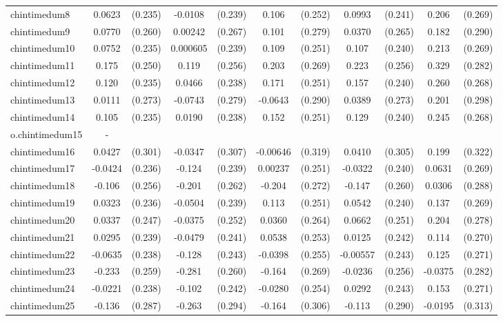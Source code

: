 \documentclass[]{article}
\begin{document}
\begin{tabular}{lcccccccccc}
chintimedum8 & 0.0623 & (0.235) & -0.0108 & (0.239) & 0.106 & (0.252) & 0.0993 & (0.241) & 0.206 & (0.269) \\
chintimedum9 & 0.0770 & (0.260) & 0.00242 & (0.267) & 0.101 & (0.279) & 0.0370 & (0.265) & 0.182 & (0.290) \\
chintimedum10 & 0.0752 & (0.235) & 0.000605 & (0.239) & 0.109 & (0.251) & 0.107 & (0.240) & 0.213 & (0.269) \\
chintimedum11 & 0.175 & (0.250) & 0.119 & (0.256) & 0.203 & (0.269) & 0.223 & (0.256) & 0.329 & (0.282) \\
chintimedum12 & 0.120 & (0.235) & 0.0466 & (0.238) & 0.171 & (0.251) & 0.157 & (0.240) & 0.260 & (0.268) \\
chintimedum13 & 0.0111 & (0.273) & -0.0743 & (0.279) & -0.0643 & (0.290) & 0.0389 & (0.273) & 0.201 & (0.298) \\
chintimedum14 & 0.105 & (0.235) & 0.0190 & (0.238) & 0.152 & (0.251) & 0.129 & (0.240) & 0.245 & (0.268) \\
o.chintimedum15 & - &  &  &  &  &  &  &  &  &  \\
chintimedum16 & 0.0427 & (0.301) & -0.0347 & (0.307) & -0.00646 & (0.319) & 0.0410 & (0.305) & 0.199 & (0.322) \\
chintimedum17 & -0.0424 & (0.236) & -0.124 & (0.239) & 0.00237 & (0.251) & -0.0322 & (0.240) & 0.0631 & (0.269) \\
chintimedum18 & -0.106 & (0.256) & -0.201 & (0.262) & -0.204 & (0.272) & -0.147 & (0.260) & 0.0306 & (0.288) \\
chintimedum19 & 0.0323 & (0.236) & -0.0504 & (0.239) & 0.113 & (0.251) & 0.0542 & (0.240) & 0.137 & (0.269) \\
chintimedum20 & 0.0337 & (0.247) & -0.0375 & (0.252) & 0.0360 & (0.264) & 0.0662 & (0.251) & 0.204 & (0.278) \\
chintimedum21 & 0.0295 & (0.239) & -0.0479 & (0.241) & 0.0538 & (0.253) & 0.0125 & (0.242) & 0.114 & (0.270) \\
chintimedum22 & -0.0635 & (0.238) & -0.128 & (0.243) & -0.0398 & (0.255) & -0.00557 & (0.243) & 0.125 & (0.271) \\
chintimedum23 & -0.233 & (0.259) & -0.281 & (0.260) & -0.164 & (0.269) & -0.0236 & (0.256) & -0.0375 & (0.282) \\
chintimedum24 & -0.0221 & (0.238) & -0.102 & (0.242) & -0.0280 & (0.254) & 0.0292 & (0.243) & 0.153 & (0.271) \\
chintimedum25 & -0.136 & (0.287) & -0.263 & (0.294) & -0.164 & (0.306) & -0.113 & (0.290) & -0.0195 & (0.313) \\

\end{tabular}
\end{document}
